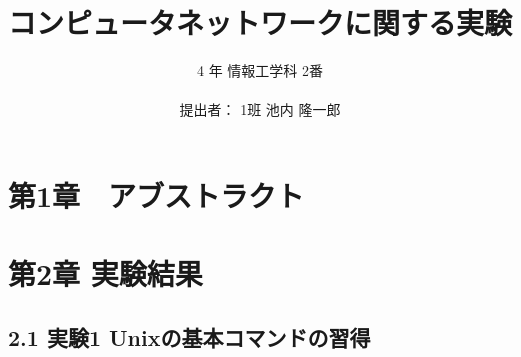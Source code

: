 \documentclass[12pt]{jreport}
\title{コンピュータネットワークに関する実験 \vspace{5cm}}
\author{\hspace{10cm} 4 年 情報工学科 2番 \\\\\hspace{9cm} 提出者： 1班 池内 隆一郎}
\date{\vspace{1cm}\hspace{-10cm}提出締め切り： 平成28年7月8日（金）\\　\\　\hspace{-120mm} 提出日： 平成28年 7月8日（金）\\\hspace{-143mm} \\　\hspace{-143mm}共同実験者
\begin{description}
\setlength{\parskip}{0.1mm}
\item1番 安西崇 \item3番 石田豊美 \item4番 荻野春樹
\item5番 茅野哲也 \item6番 黒田滉平 \item7番 鴻上遼河
\end{description}}
\begin{document}
    
    \maketitle
    \newpage

    \chapter*{第1章　アブストラクト}

    \chapter*{第2章 実験結果}
        \section*{2.1 実験1 Unixの基本コマンドの習得}
\end{document}
